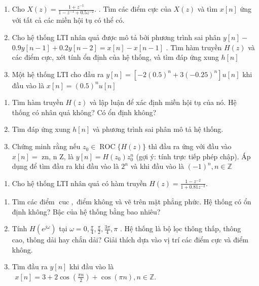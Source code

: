 \documentclass[
  10
]{article}
\providecommand{\tightlist}{%
  \setlength{\itemsep}{0pt}\setlength{\parskip}{0pt}}
\begin{document}
\begin{enumerate}
\def\labelenumi{\arabic{enumi}.}
\setcounter{enumi}{10}
\item
  Cho
  \(X ( z ) = { \frac { 1 + z ^ { - 1 } } { 1 - z ^ { - 1 } + 0 . 5 z ^ { - 2 } } } .\)
  . Tìm các điểm cực của \(X ( z )\) và tìm \(x [ n ]\) ứng với tất cả
  các miền hội tụ có thể có.
\item
  Cho hệ thống LTI nhân quả được mô tả bởi phương trình sai phân
  \(y [ n ] -\)
  \(0 . 9 y [ n - 1 ] + 0 . 2 y [ n - 2 ] = x [ n ] - x [ n - 1 ]\) .
  Tìm hàm truyền \(H ( z )\) và các điểm cực, xét tính ổn định của hệ
  thống, và tìm đáp ứng xung \(h [ n ]\)
\item
  Một hệ thống LTI cho đầu ra
  \(y [ n ] = \left[ - 2 ( 0 . 5 ) ^ { n } + 3 ( - 0 . 2 5 ) ^ { n } \right] u [ n ]\)
  khi đầu vào là \(x [ n ] = ( 0 . 5 ) ^ { n } u [ n ]\)
\end{enumerate}

\begin{enumerate}
\def\labelenumi{(\alph{enumi})}
\item
  Tìm hàm truyền \(H ( z )\) và lập luận để xác định miền hội tụ của nó.
  Hệ thống có nhân quả không? Có ổn định không?
\item
  Tìm đáp ứng xung \(h [ n ]\) và phương trình sai phân mô tả hệ thống.
\item
  Chứng minh rằng nếu
  \(z _ { 0 } \in \operatorname { R O C } \{ H ( z ) \}\) thì đầu ra ứng
  với đầu vào \(x [ n ] =\) zn, n Z, là
  \(y [ n ] = H ( z _ { 0 } ) z _ { 0 } ^ { n }\) (gợi ý: tính trực tiếp
  phép chập). Áp dụng để tìm đầu ra khi đầu vào là \(2 ^ { n }\) và khi
  đầu vào là \(( - 1 ) ^ { n } , n \in \mathbb { Z }\)
\end{enumerate}

\begin{enumerate}
\def\labelenumi{\arabic{enumi}.}
\setcounter{enumi}{13}
\tightlist
\item
  Cho hệ thống LTI nhân quả có hàm truyền
  \(H ( z ) = \frac { 1 - z ^ { - 2 } } { 1 + 0 . 8 1 z ^ { - 2 } } .\)
\end{enumerate}

\begin{enumerate}
\def\labelenumi{(\alph{enumi})}
\item
  Tìm các điểm \(\operatorname { c u c } ,\) điểm không và vẽ trên mặt
  phẳng phức. Hệ thống có ổn định không? Bậc của hệ thống bằng bao
  nhiêu?
\item
  Tính \(H ( e ^ { j \omega } )\) tại
  \(\omega = 0 , { \textstyle \frac { \pi } { 4 } } , { \textstyle \frac { \pi } { 2 } } , { \textstyle \frac { 3 \pi } { 4 } } , \pi\)
  . Hệ thống là bộ lọc thông thấp, thông cao, thông dải hay chắn dải?
  Giải thích dựa vào vị trí các điểm cực và điểm không.
\item
  Tìm đầu ra \(y [ n ]\) khi đầu vào là
  \(\begin{array} { r } { x [ n ] = 3 + 2 \cos { \left( \frac { \pi n } { 2 } \right) } + \cos ( \pi n ) , n \in \mathbb { Z } . } \end{array}\)
\end{enumerate}
\end{document}
